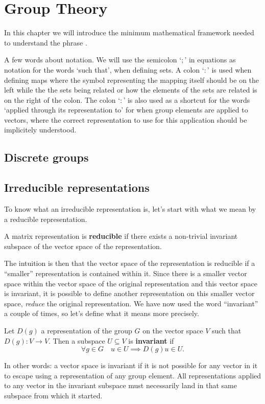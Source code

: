 \chapter{Group Theory}

In this chapter we will introduce the minimum mathematical framework needed to
understand the phrase .

A few words about notation. We will use the semicolon `$;$' in equations as notation for the words `such that', \eg when defining sets.
A colon `$\colon$' is used when defining maps where the symbol representing the mapping itself should be on the left while the the sets
being related or how the elements of the sets are related is on the right of the colon. The colon `$:$' is also used as a shortcut for the
words `applied through its representation to' for when group elements are applied to vectors, where the correct representation to use
for this application should be implicitely understood.

\section{Discrete groups}

\section{Irreducible representations}

To know what an irreducible representation is, let's start with what we mean by a reducible representation.
\begin{defi}
    A matrix representation is \textbf{reducible} if there exists a non-trivial invariant subspace of the vector space of the representation.
\end{defi}
The intuition is then that the vector space of the representation is reducible if a ``smaller'' representation is contained within it. Since
there is a smaller vector space within the vector space of the original representation and this vector space is invariant, it is possible
to define another representation on this smaller vector space, \ie\emph{reduce} the original representation. We have now used the word
``invariant'' a couple of times, so let's define what it means more precisely.

\begin{defi}
    Let $D(g)$ a representation of the group $G$ on the vector space $V$ such that $D(g)\colon V\rightarrow V$. Then
    a subspace $U\subseteq V$ is \textbf{invariant} if 
    \begin{equation}
        \label{eq:Group:Irr:invariantDef}
        \forall g\in G\quad u\in U \implies D(g)u\in U.
    \end{equation}
\end{defi}
In other words: a vector space is invariant if it is not possible for any vector in it to escape using a representation of any group element.
All representations applied to any vector in the invariant subspace must necessarily land in that same subspace from which it started.

